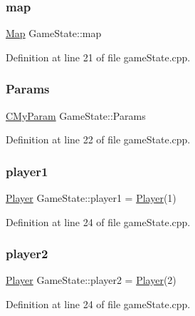 \subsubsection{\texorpdfstring{map}{map}}
{\footnotesize\ttfamily \hyperlink{classns_game_1_1_map}{Map} Game\+State\+::map}



Definition at line 21 of file game\+State.\+cpp.

\mbox{\label{class_game_state_a86e79cf78384b38102469e7a4ff1316e}} 
\subsubsection{\texorpdfstring{Params}{Params}}
{\footnotesize\ttfamily \hyperlink{struct_c_my_param}{C\+My\+Param} Game\+State\+::\+Params}



Definition at line 22 of file game\+State.\+cpp.

\mbox{\label{class_game_state_a4de1875551db7326acb57b305dee02ac}} 
\subsubsection{\texorpdfstring{player1}{player1}}
{\footnotesize\ttfamily \hyperlink{classns_game_1_1_player}{Player} Game\+State\+::player1 = \hyperlink{classns_game_1_1_player}{Player}(1)}



Definition at line 24 of file game\+State.\+cpp.

\mbox{\label{class_game_state_a72c17b0083dee464947c0532b5bfefcd}} 
\subsubsection{\texorpdfstring{player2}{player2}}
{\footnotesize\ttfamily \hyperlink{classns_game_1_1_player}{Player} Game\+State\+::player2 = \hyperlink{classns_game_1_1_player}{Player}(2)}



Definition at line 24 of file game\+State.\+cpp.

